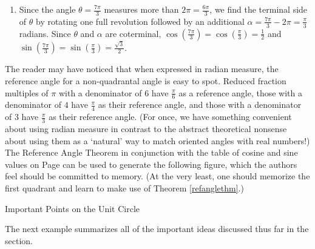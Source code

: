{\begin{enumerate}
\item  Since the angle $\theta = \frac{7 \pi}{3}$ measures more than $2 \pi = \frac{6 \pi}{3}$, we find the terminal side of $\theta$ by rotating one full revolution followed by an additional $\alpha = \frac{7 \pi}{3} - 2\pi = \frac{\pi}{3}$ radians.  Since $\theta$ and $\alpha$ are coterminal,  $\cos\left(\frac{7\pi}{3}\right) = \cos\left(\frac{\pi}{3}\right) = \frac{1}{2}$ and $\sin\left(\frac{7\pi}{3}\right) = \sin\left(\frac{\pi}{3}\right) = \frac{\sqrt{3}}{2}$.





\end{enumerate}
}

\pagebreak

The reader may have noticed that when expressed in radian measure, the reference angle for a non-quadrantal angle is easy to spot.  Reduced fraction multiples of $\pi$ with a denominator of $6$ have $\frac{\pi}{6}$ as a reference angle, those with a denominator of $4$ have $\frac{\pi}{4}$ as their reference angle, and those with a denominator of $3$ have $\frac{\pi}{3}$ as their reference angle. (For once, we have something convenient about using radian measure in contrast to the abstract theoretical nonsense about using them as a `natural' way to match oriented angles with real numbers!)  The Reference Angle Theorem in conjunction with the table of cosine and sine values on Page \pageref{CosineSineFacts} can be used to generate the following figure, which the authors feel should be committed to memory. (At the very least, one should memorize the first quadrant and learn to make use of Theorem \ref{refanglethm}.)

\medskip
\noindent\begin{minipage}{\textwidth}


\begin{center}
\end{center}
\captionsetup{type=figure}
\caption{Important Points on the Unit Circle}\label{commonanglesunitcircle}
\end{minipage}

\pagebreak

The next example summarizes all of the important ideas discussed thus far in the section.

